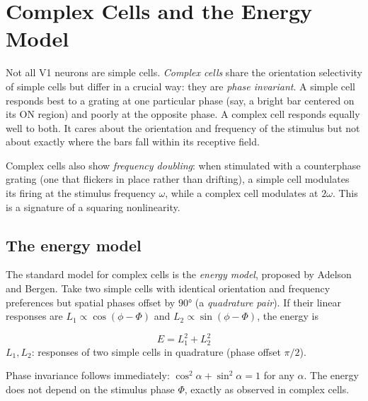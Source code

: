 \section{Complex Cells and the Energy Model}
\label{sec:complex-cells}

Not all V1 neurons are simple cells. \emph{Complex cells} share the orientation selectivity of simple cells but differ in a crucial way: they are \emph{phase invariant}. A simple cell responds best to a grating at one particular phase (say, a bright bar centered on its ON region) and poorly at the opposite phase. A complex cell responds equally well to both. It cares about the orientation and frequency of the stimulus but not about exactly where the bars fall within its receptive field.

Complex cells also show \emph{frequency doubling}: when stimulated with a counterphase grating (one that flickers in place rather than drifting), a simple cell modulates its firing at the stimulus frequency $\omega$, while a complex cell modulates at $2\omega$. This is a signature of a squaring nonlinearity.

\subsection{The energy model}

The standard model for complex cells is the \emph{energy model}, proposed by Adelson and Bergen. Take two simple cells with identical orientation and frequency preferences but spatial phases offset by $90°$ (a \emph{quadrature pair}). If their linear responses are $L_1 \propto \cos(\phi - \Phi)$ and $L_2 \propto \sin(\phi - \Phi)$, the energy is

\begin{keyequation}
\begin{equation}
  E = L_1^2 + L_2^2
  \label{eq:energy-model}
\end{equation}
\tcblower
$L_1, L_2$: responses of two simple cells in quadrature (phase offset $\pi/2$).
\end{keyequation}

\noindent Phase invariance follows immediately: $\cos^2\!\alpha + \sin^2\!\alpha = 1$ for any $\alpha$. The energy does not depend on the stimulus phase $\Phi$, exactly as observed in complex cells.

